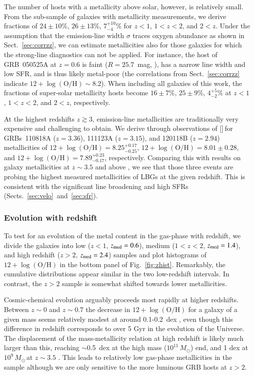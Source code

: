 \documentclass[traditabstract, longauth]{aa}
\newcommand{\oh}{12+\log(\mathrm{O/H})}
\newcommand{\neiii}{[\ion{Ne}{iii}]}
\newcommand{\Msun}{$M_\odot$}
\begin{document}
{The number of hosts with a metallicity above solar, however, is relatively small. From the sub-sample of galaxies with metallicity measurements, we derive fractions of $24\pm 10$\%, $26\pm 13$\%, $7_{-4}^{+10}$\% for $z<1$, $1<z<2$, and $2<z$. Under the assumption that the emission-line width $\sigma$ traces oxygen abundance as shown in Sect.~\ref{sec:corrzz}, we can estimate metallicities also for those galaxies for which the strong-line diagnostics can not be applied. For instance, the host of GRB~050525A at $z=0.6$ is faint ($R=25.7$~mag, \citealp{2012ApJ...756..187H}), has a narrow line width and low SFR, and is thus likely metal-poor (the correlations from Sect.~\ref{sec:corrzz} indicate $\oh\sim8.2$). When including all galaxies of this work, the fractions of super-solar metallicity hosts become $16\pm7$\%, $25\pm9$\%, $4_{-2}^{+5}$\% at $z<1$, $1<z<2$, and $2<z$, respectively.}

At the highest redshifts $z\gtrsim3$, emission-line metallicities are traditionally very expensive and challenging to obtain. We derive through observations of \neiii\,for GRBs~110818A ($z=3.36$), 111123A ($z=3.15$), and 120118B ($z=2.94$) metallicities of $\oh=8.25_{-0.25}^{+0.17}$, $\oh=8.01\pm0.28$, and $\oh=7.89_{-0.17}^{+0.23}$, respectively. Comparing this with results on galaxy metallicities at $z\sim3.5$ and above \citep{2008A&A...488..463M, 2011ApJ...739....1L}, we see that those three events are probing the highest measured metallicities of LBGs at the given redshift. This is consistent with the significant line broadening and high SFRs (Sects.~\ref{sec:velo}~and~\ref{sec:sfr}).


\subsubsection{Evolution with redshift}

To test for an evolution of the metal content in the gas-phase with redshift, we divide the galaxies into low ($z<1$, $z_{\rm{med}}=0.6$), medium ($1<z<2$, $z_{\rm{med}}=1.4$), and high redshift ($z>2$, $z_{\rm{med}} = 2.4$) samples and plot histograms of $\oh$ in the bottom panel of Fig.~\ref{fig:zhist}. Remarkably, the cumulative distributions appear similar in the two low-redshift intervals. In contrast, the $z>2$ sample is somewhat shifted towards lower metallicities.

Cosmic-chemical evolution arguably proceeds most rapidly at higher redshifts. Between $z\sim0$ and $z\sim0.7$ the decrease in $\oh$ for a galaxy of a given mass seems relatively modest at around 0.1-0.2~dex \citep{2004ApJ...613..898T, 2005ApJ...635..260S}, even though this difference in redshift corresponds to over 5 Gyr in the evolution of the Universe. The displacement of the mass-metallicity relation at high redshift is likely much larger than this, reaching $\sim$0.5~dex at the high mass ($10^{11}$\,\Msun) end, and 1 dex at $10^{9}$\,\Msun\,at $z\sim3.5$ \citep{2008A&A...488..463M, 2014A&A...563A..58T}. This leads to relatively low gas-phase metallicities in the sample although we are only sensitive to the more luminous GRB hosts at $z>2$.
\end{document}

